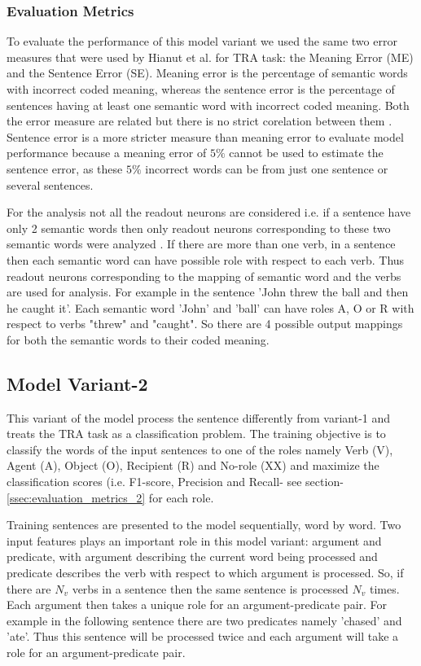 \subsubsection{Evaluation Metrics}\label{ssec:evaluation_mertics_1}

To evaluate the performance of this model variant we used the same two error measures that were used by Hianut et al.\cite{xavier:2013:RT} for TRA task: the Meaning Error (ME) and the Sentence Error (SE). Meaning error is the percentage of semantic words with incorrect coded meaning, whereas the sentence error is the percentage of sentences having at least one semantic word with incorrect coded meaning. Both the error measure are related but there is no strict corelation between them \cite{xavier:2013:RT}. Sentence error is a more stricter measure than meaning error to evaluate model performance because a meaning error of $5\%$ cannot be used to estimate the sentence error, as these $5\%$ incorrect words can be from just one sentence or several sentences. 

For the analysis not all the readout neurons are considered i.e. if a sentence have only 2 semantic words then only readout neurons corresponding to these two semantic words were analyzed \cite{xavier:2013:RT}. If there are more than one verb, in a sentence then each semantic word can have possible role with respect to each verb. Thus readout neurons corresponding to the mapping of semantic word and the verbs are used for analysis. For example in the sentence 'John threw the ball and then he caught it'. Each semantic word 'John' and 'ball' can have  roles A, O or R with respect to verbs "threw" and "caught". So there are 4 possible output mappings for both the semantic words to their coded meaning. 

\subsection{Model Variant-2}

This variant of the model process the sentence differently from variant-1 and treats the TRA task as a classification problem. The training objective is to classify the words of the input  sentences to one of the roles namely Verb (V), Agent (A), Object (O), Recipient (R) and No-role (XX) and maximize the classification scores (i.e. F1-score, Precision and Recall- see section-\ref{ssec:evaluation_metrics_2} for each role. 

Training sentences are presented to the model sequentially, word by word. Two input features plays an important role in this model variant: argument and predicate, with argument describing the current word being processed and predicate describes the verb with respect to which argument is processed. So, if there are $N_{v}$ verbs in a sentence then the same sentence is processed $N_{v}$ times. Each argument then takes a unique role for an argument-predicate pair. For example in the following sentence there are two predicates namely 'chased' and 'ate'. Thus this sentence will be processed twice and each argument will take a role for an argument-predicate pair.

